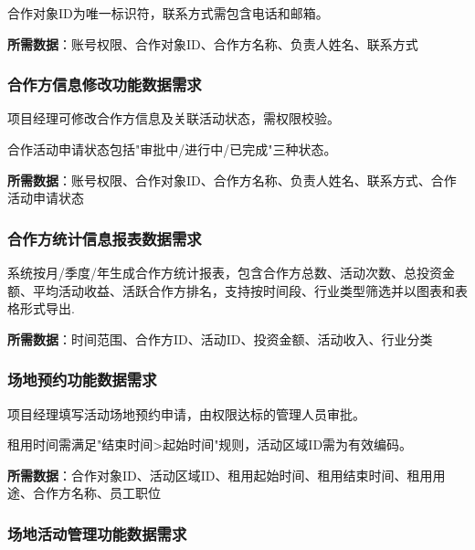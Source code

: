 \documentclass[]{article}
\begin{document}
合作对象ID为唯一标识符，联系方式需包含电话和邮箱。

\textbf{所需数据}：账号权限、合作对象ID、合作方名称、负责人姓名、联系方式

\hypertarget{ux5408ux4f5cux65b9ux4fe1ux606fux4feeux6539ux529fux80fdux6570ux636eux9700ux6c42}{%
  \subsubsection{合作方信息修改功能数据需求}\label{ux5408ux4f5cux65b9ux4fe1ux606fux4feeux6539ux529fux80fdux6570ux636eux9700ux6c42}}

项目经理可修改合作方信息及关联活动状态，需权限校验。

合作活动申请状态包括"审批中/进行中/已完成"三种状态。

\textbf{所需数据}：账号权限、合作对象ID、合作方名称、负责人姓名、联系方式、合作活动申请状态

\hypertarget{ux5408ux4f5cux65b9ux7edfux8ba1ux4fe1ux606fux62a5ux8868ux6570ux636eux9700ux6c42}{%
  \subsubsection{合作方统计信息报表数据需求}\label{ux5408ux4f5cux65b9ux7edfux8ba1ux4fe1ux606fux62a5ux8868ux6570ux636eux9700ux6c42}}

系统按月/季度/年生成合作方统计报表，包含合作方总数、活动次数、总投资金额、平均活动收益、活跃合作方排名，支持按时间段、行业类型筛选并以图表和表格形式导出.

\textbf{所需数据}：时间范围、合作方ID、活动ID、投资金额、活动收入、行业分类

\hypertarget{ux573aux5730ux9884ux7ea6ux529fux80fdux6570ux636eux9700ux6c42}{%
  \subsubsection{场地预约功能数据需求}\label{ux573aux5730ux9884ux7ea6ux529fux80fdux6570ux636eux9700ux6c42}}

项目经理填写活动场地预约申请，由权限达标的管理人员审批。

租用时间需满足"结束时间\textgreater{}起始时间"规则，活动区域ID需为有效编码。

\textbf{所需数据}：合作对象ID、活动区域ID、租用起始时间、租用结束时间、租用用途、合作方名称、员工职位

\hypertarget{ux573aux5730ux6d3bux52a8ux7ba1ux7406ux529fux80fdux6570ux636eux9700ux6c42}{%
  \subsubsection{场地活动管理功能数据需求}\label{ux573aux5730ux6d3bux52a8ux7ba1ux7406ux529fux80fdux6570ux636eux9700ux6c42}}
\end{document}
